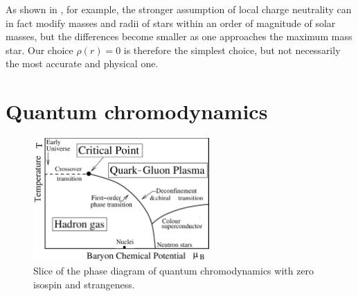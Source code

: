 As shown in \cite{ref:global_neutrality}, for example, the stronger assumption of local charge neutrality can in fact modify masses and radii of stars within an order of magnitude of solar masses,
but the differences become smaller as one approaches the maximum mass star.
Our choice $\rho(r)=0$ is therefore the simplest choice, but not necessarily the most accurate and physical one.

\section{Quantum chromodynamics}
\label{sec:master_intro:qcd}

\begin{figure}[t]
\centering
\includegraphics[width=0.6\textwidth]{figures/qcd-phase-diagram.png}
\caption{%
	Slice of the phase diagram of quantum chromodynamics with zero isospin and strangeness.
}
\label{fig:qcd:phase_diagram}
\end{figure}

